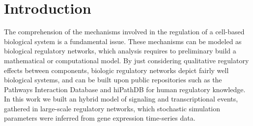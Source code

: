 
\section{Introduction}






The comprehension of the mechanisms involved in the regulation of a cell-based biological system is a fundamental 
issue. These mechanisms can be modeled as biological regulatory networks, which analysis requires to preliminary build a 
mathematical or computational model. 
By just considering qualitative regulatory effects between components, biologic regulatory networks
depict fairly well biological systems, and can be built upon public repositories such as the Pathways 
Interaction Database \cite{schaefer2009pid} and  
hiPathDB \cite{yu2012hipathdb} for human regulatory knowledge.
In this work we built an hybrid model of signaling and transcriptional events, gathered in large-scale regulatory networks, 
which stochastic simulation parameters were inferred from 
gene expression time-series data.  


